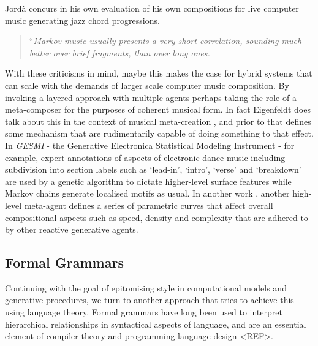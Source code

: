 Jordà concurs in his own evaluation of his own compositions for live computer music generating jazz chord progressions. 

\blockcquote[]{Jorda1991}{``\textit{Markov music usually presents a very short correlation, sounding much better over brief fragments, than over long ones.}}

With these criticisms in mind, maybe this makes the case for hybrid systems that can scale with the demands of larger scale computer music composition. By invoking a layered approach with multiple agents perhaps taking the role of a meta-composer for the purposes of coherent musical form. In fact Eigenfeldt does talk about this in the context of musical meta-creation \citep{Eigenfeldt2016}, and prior to that defines some mechanism that are rudimentarily capable of doing something to that effect. In \textit{GESMI} - the Generative Electronica Statistical Modeling Instrument \citep{Eigenfeldt2013} - for example, expert annotations of aspects of electronic dance music including subdivision into section labels such as `lead-in', `intro', `verse' and `breakdown' are used by a genetic algorithm to dictate higher-level surface features while Markov chains generate localised motifs as usual. In another work \citep{Eigenfeldt2016a}, another high-level meta-agent defines a series of parametric curves that affect overall compositional aspects such as speed, density and complexity that are adhered to by other reactive generative agents.

\subsection{Formal Grammars}

Continuing with the goal of epitomising style in computational models and generative procedures, we turn to another approach that tries to achieve this using language theory. Formal grammars have long been used to interpret hierarchical relationships in syntactical aspects of language, and are an essential element of compiler theory and programming language design <REF>.

